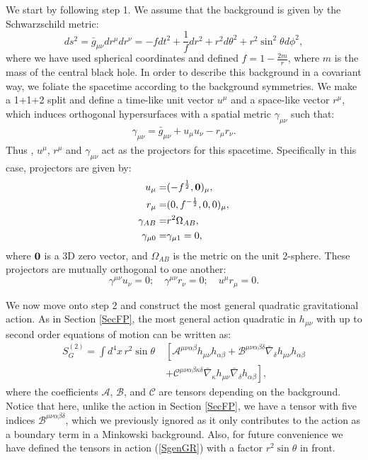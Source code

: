 \documentclass[10pt,twocolumn,preprintnumbers,amsmath,amssymb,nofootinbib
,superscriptaddress]{revtex4-1}
\begin{document}
We start by following step 1. We assume that the background is given by the Schwarzschild metric:
\begin{equation}
ds^2=\bar{g}_{\mu\nu}dr^\mu dr^\nu=-fdt^2+\frac{1}{f}dr^2+r^2d\theta^2+r^2\sin^2\theta d\phi^2, \label{schmetric}
\end{equation}
where we have used spherical coordinates and defined $f=1-\frac{2m}{r}$, where $m$ is the mass of the central black hole. In order to describe this background in a covariant way, we foliate the spacetime according to the background symmetries. We make a 1+1+2 split and define a time-like unit vector $u^\mu$ and a space-like vector $r^\mu$, which induces orthogonal hypersurfaces with a spatial metric $\gamma_{\mu\nu}$ such that:
\begin{align}
\gamma_{\mu\nu}=\bar{g}_{\mu\nu}+u_\mu u_\nu-r_\mu r_\nu. \label{gammadef}
\end{align}
Thus , $u^\mu$, $r^\mu$ and $\gamma_{\mu\nu}$ act as the projectors for this spacetime. Specifically in this case, projectors are given by:
\begin{align}
u_\mu = & (-f^{\frac{1}{2}},\bf{0})_\mu,\\
r_\mu = & (0,f^{-\frac{1}{2}},0,0)_\mu,\\
\gamma_{AB} = &r^2\Omega_{AB},\\
\gamma_{\mu0} = & \gamma_{\mu 1}= 0,
\end{align}
where $\bf{0}$ is a 3D zero vector, and $\Omega_{AB}$ is the metric on the unit 2-sphere. These projectors are mutually orthogonal to one another:
\begin{equation}
 \gamma^{\mu\nu}u_\nu=0; \quad \gamma^{\mu\nu}r_\nu=0; \quad u^\mu r_\mu =0.
\end{equation}

We now move onto step 2 and construct the most general quadratic gravitational action. As in Section \ref{SecFP}, the most general action quadratic in $h_{\mu\nu}$ with up to second order equations of motion can be written as:
\begin{align}
S_G^{(2)}=\int d^4x\,r^2\sin\theta\;&\left[ \mathcal{A}^{\mu\nu\alpha\beta} h_{\mu\nu} h_{\alpha\beta}
 + \mathcal{B}^{\mu\nu\alpha\beta\delta}\bar{\nabla}_{\delta} h_{\mu\nu} h_{\alpha\beta}
\right. \nonumber \\ &\left. + \mathcal{C}^{\mu\nu\alpha\beta\kappa\delta}\bar{\nabla}_{\kappa} h_{\mu\nu} \bar{\nabla}_{\delta} h_{\alpha\beta}\right], \label{SgenGR}
\end{align}
where the coefficients $\mathcal{A}$, $\mathcal{B}$, and $\mathcal{C}$ are tensors depending on the background. Notice that here, unlike the action in Section \ref{SecFP}, we have a tensor with five indices $\mathcal{B}^{\mu\nu\alpha\beta\delta}$, which we previously ignored as it only contributes to the action as a boundary term in a Minkowski background. Also, for future convenience we have defined the tensors in action (\ref{SgenGR}) with a factor $r^2\sin\theta$ in front. 
\end{document}
